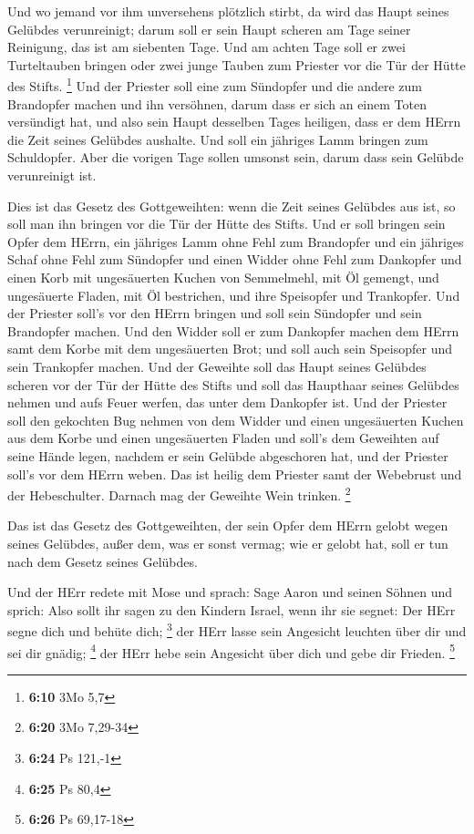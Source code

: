  Und wo jemand vor ihm unversehens plötzlich stirbt, da wird
das Haupt seines Gelübdes verunreinigt; darum soll er sein Haupt scheren
am Tage seiner Reinigung, das ist am siebenten Tage.  Und
am achten Tage soll er zwei Turteltauben bringen oder zwei junge Tauben
zum Priester vor die Tür der Hütte des Stifts. \footnote{\textbf{6:10}
  3Mo 5,7}  Und der Priester soll eine zum Sündopfer und
die andere zum Brandopfer machen und ihn versöhnen, darum dass er sich
an einem Toten versündigt hat, und also sein Haupt desselben Tages
heiligen,  dass er dem HErrn die Zeit seines Gelübdes
aushalte. Und soll ein jähriges Lamm bringen zum Schuldopfer. Aber die
vorigen Tage sollen umsonst sein, darum dass sein Gelübde verunreinigt
ist.

 Dies ist das Gesetz des Gottgeweihten: wenn die Zeit
seines Gelübdes aus ist, so soll man ihn bringen vor die Tür der Hütte
des Stifts.  Und er soll bringen sein Opfer dem HErrn, ein
jähriges Lamm ohne Fehl zum Brandopfer und ein jähriges Schaf ohne Fehl
zum Sündopfer und einen Widder ohne Fehl zum Dankopfer  und
einen Korb mit ungesäuerten Kuchen von Semmelmehl, mit Öl gemengt, und
ungesäuerte Fladen, mit Öl bestrichen, und ihre Speisopfer und
Trankopfer.  Und der Priester soll's vor den HErrn bringen
und soll sein Sündopfer und sein Brandopfer machen.  Und
den Widder soll er zum Dankopfer machen dem HErrn samt dem Korbe mit dem
ungesäuerten Brot; und soll auch sein Speisopfer und sein Trankopfer
machen.  Und der Geweihte soll das Haupt seines Gelübdes
scheren vor der Tür der Hütte des Stifts und soll das Haupthaar seines
Gelübdes nehmen und aufs Feuer werfen, das unter dem Dankopfer ist.
 Und der Priester soll den gekochten Bug nehmen von dem
Widder und einen ungesäuerten Kuchen aus dem Korbe und einen
ungesäuerten Fladen und soll's dem Geweihten auf seine Hände legen,
nachdem er sein Gelübde abgeschoren hat,  und der Priester
soll's vor dem HErrn weben. Das ist heilig dem Priester samt der
Webebrust und der Hebeschulter. Darnach mag der Geweihte Wein trinken.
\footnote{\textbf{6:20} 3Mo 7,29-34}

 Das ist das Gesetz des Gottgeweihten, der sein Opfer dem
HErrn gelobt wegen seines Gelübdes, außer dem, was er sonst vermag; wie
er gelobt hat, soll er tun nach dem Gesetz seines Gelübdes.

 Und der HErr redete mit Mose und sprach: 
Sage Aaron und seinen Söhnen und sprich: Also sollt ihr sagen zu den
Kindern Israel, wenn ihr sie segnet:  Der HErr segne dich
und behüte dich; \footnote{\textbf{6:24} Ps 121,-1}  der
HErr lasse sein Angesicht leuchten über dir und sei dir gnädig;
\footnote{\textbf{6:25} Ps 80,4}  der HErr hebe sein
Angesicht über dich und gebe dir Frieden. \footnote{\textbf{6:26} Ps
  69,17-18}

